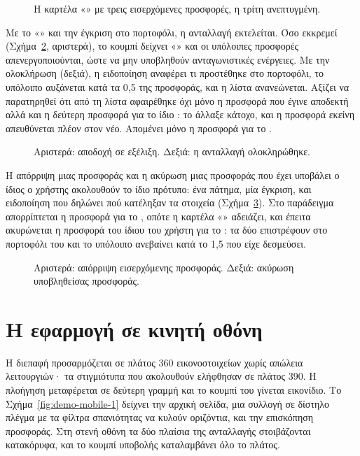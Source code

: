 \begin{figure}[H]
\centering
{}
\caption{Η καρτέλα «» με τρεις εισερχόμενες προσφορές, η τρίτη ανεπτυγμένη.}
\label{fig:demo-received}
\end{figure}

Με το «» και την έγκριση στο πορτοφόλι, η ανταλλαγή εκτελείται. Όσο
εκκρεμεί (Σχήμα~\ref{fig:demo-accept}, αριστερά), το κουμπί δείχνει «» και
οι υπόλοιπες προσφορές απενεργοποιούνται, ώστε να μην υποβληθούν ανταγωνιστικές ενέργειες.
Με την ολοκλήρωση (δεξιά), η ειδοποίηση αναφέρει τι προστέθηκε στο πορτοφόλι, το
υπόλοιπο αυξάνεται κατά τα 0{,}5  της προσφοράς, και η λίστα ανανεώνεται. Αξίζει να
παρατηρηθεί ότι από τη λίστα αφαιρέθηκε όχι μόνο η προσφορά που έγινε αποδεκτή αλλά και η
δεύτερη προσφορά για το ίδιο : το  άλλαξε κάτοχο, και η προσφορά εκείνη
απευθύνεται πλέον στον νέο. Απομένει μόνο η προσφορά για το .

\begin{figure}[H]
\centering
{}
\caption{Αριστερά: αποδοχή σε εξέλιξη. Δεξιά: η ανταλλαγή ολοκληρώθηκε.}
\label{fig:demo-accept}
\end{figure}

Η απόρριψη μιας προσφοράς και η ακύρωση μιας προσφοράς που έχει υποβάλει ο ίδιος ο χρήστης
ακολουθούν το ίδιο πρότυπο: ένα πάτημα, μία έγκριση, και ειδοποίηση που δηλώνει πού
κατέληξαν τα στοιχεία (Σχήμα~\ref{fig:demo-reject-cancel}). Στο παράδειγμα απορρίπτεται η
προσφορά για το , οπότε η καρτέλα «» αδειάζει, και έπειτα
ακυρώνεται η προσφορά του ίδιου του χρήστη για το : τα δύο 
επιστρέφουν στο πορτοφόλι του και το υπόλοιπο ανεβαίνει κατά το 1{,}5  που είχε
δεσμεύσει.

\begin{figure}[H]
\centering
{}
\caption{Αριστερά: απόρριψη εισερχόμενης προσφοράς. Δεξιά: ακύρωση υποβληθείσας
προσφοράς.}
\label{fig:demo-reject-cancel}
\end{figure}

\section{Η εφαρμογή σε κινητή οθόνη}
\label{sec:demo-mobile}

Η διεπαφή προσαρμόζεται σε πλάτος 360 εικονοστοιχείων χωρίς απώλεια λειτουργιών· τα
στιγμιότυπα που ακολουθούν ελήφθησαν σε πλάτος 390. Η πλοήγηση μεταφέρεται σε δεύτερη
γραμμή και το κουμπί του  γίνεται εικονίδιο. Το Σχήμα~\ref{fig:demo-mobile-1}
δείχνει την αρχική σελίδα, μια συλλογή σε δίστηλο πλέγμα με τα φίλτρα σπανιότητας να
κυλούν οριζόντια, και την επισκόπηση προσφοράς. Στη στενή οθόνη τα δύο πλαίσια της
ανταλλαγής στοιβάζονται κατακόρυφα, και το κουμπί υποβολής καταλαμβάνει όλο το πλάτος.

